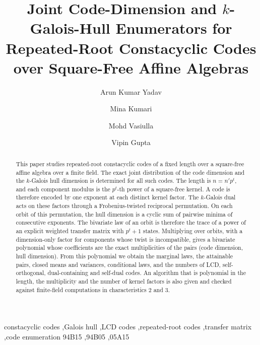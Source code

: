 \documentclass[preprint,12pt,a4paper]{elsarticle}
\theoremstyle{definition}
\theoremstyle{remark}
\begin{document}
\begin{frontmatter}

\title{Joint Code-Dimension and $k$-Galois-Hull Enumerators for
Repeated-Root Constacyclic Codes over Square-Free Affine Algebras}

\author[krmu]{Arun Kumar Yadav}

\author[krmu]{Mina Kumari}

\author[sru]{Mohd Vasiulla}

\author[gu]{Vipin Gupta}

\address[krmu]{School of Basic and Applied Sciences, K.R. Mangalam University,
Sohna Road, Gurugram 122103, Haryana, India}
\address[sru]{Department of Mathematics, School of Computer Science \&
Artificial Intelligence, SR University, Warangal 506371, Telangana, India}
\address[gu]{Department of Mathematics, Gurugram University, Gurugram 122505,
Haryana, India}

\begin{abstract}
This paper studies repeated-root constacyclic codes of a fixed length over a
square-free affine algebra over a finite field. The exact joint distribution of
the code dimension and the $k$-Galois hull dimension is determined for all such
codes. The length is $n=n'p^{t}$, and each component modulus is the $p^{t}$-th
power of a square-free kernel. A code is therefore encoded by one exponent at
each distinct kernel factor. The $k$-Galois dual acts on these factors through
a Frobenius-twisted reciprocal permutation. On each orbit of this permutation,
the hull dimension is a cyclic sum of pairwise minima of consecutive exponents.
The bivariate law of an orbit is therefore the trace of a power of an explicit
weighted transfer matrix with $p^{t}+1$ states. Multiplying over orbits, with a
dimension-only factor for components whose twist is incompatible, gives a
bivariate polynomial whose coefficients are the exact multiplicities of the
pairs (code dimension, hull dimension). From this polynomial we obtain the
marginal laws, the attainable pairs, closed means and variances, conditional
laws, and the numbers of LCD, self-orthogonal, dual-containing and self-dual
codes. An algorithm that is polynomial in the length, the multiplicity and the
number of kernel factors is also given and checked against finite-field
computations in characteristics $2$ and $3$.
\end{abstract}

\begin{keyword}
constacyclic codes \sep Galois hull \sep LCD codes \sep repeated-root codes
\sep transfer matrix \sep code enumeration
\MSC[2020] 94B15 \sep 94B05 \sep 05A15
\end{keyword}

\end{frontmatter}
\end{document}
